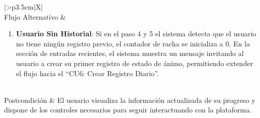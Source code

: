 \begin{xltabular}{\textwidth}{|>{\bfseries}p{3.5cm}|X|}
    \\ \hline
    Flujo Alternativo & 
    \begin{enumerate}[leftmargin=0.5cm, topsep=0pt, partopsep=0pt, parsep=0pt, itemsep=4pt]
        \item \textbf{Usuario Sin Historial}: Si en el paso 4 y 5 el sistema detecta que el usuario no tiene ningún registro previo, el contador de racha se inicializa a 0. En la sección de entradas recientes, el sistema muestra un mensaje invitando al usuario a crear su primer registro de estado de ánimo, permitiendo extender el flujo hacia el ``CU6: Crear Registro Diario''.
    \end{enumerate}
    \\ \hline
    Postcondición & El usuario visualiza la información actualizada de su progreso y dispone de los controles necesarios para seguir interactuando con la plataforma. \\ \hline

    \caption{CU9: Visualizar Dashboard}
    \label{tab:esp_cu9} \\
\end{xltabular}
\endgroup

